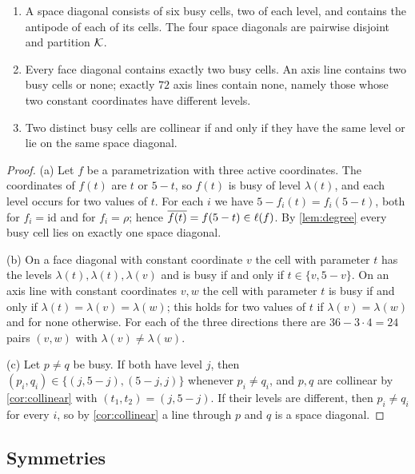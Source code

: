 \begin{lemma}\label{lem:busy}
\begin{enumerate}[label=\textup{(\alph*)}]
\item A space diagonal consists of six busy cells, two of each level, and contains the antipode of each
      of its cells. The four space diagonals are pairwise disjoint and partition $\mathcal{K}$.
\item Every face diagonal contains exactly two busy cells. An axis line contains two busy cells or none;
      exactly $72$ axis lines contain none, namely those whose two constant coordinates have different
      levels.
\item Two distinct busy cells are collinear if and only if they have the same level or lie on the same
      space diagonal.
\end{enumerate}
\end{lemma}

\begin{proof}
(a) Let $f$ be a parametrization with three active coordinates. The coordinates of $f(t)$ are $t$ or
$5-t$, so $f(t)$ is busy of level $\lambda(t)$, and each level occurs for two values of $t$. For each $i$
we have $5-f_i(t)=f_i(5-t)$, both for $f_i=\mathrm{id}$ and for $f_i=\rho$; hence
$\overline{f(t)}=f(5-t)\in\ell(f)$. By \cref{lem:degree} every busy cell lies on exactly one space diagonal.

(b) On a face diagonal with constant coordinate $v$ the cell with parameter $t$ has the levels
$\lambda(t),\lambda(t),\lambda(v)$ and is busy if and only if $t\in\{v,5-v\}$. On an axis line with constant
coordinates $v,w$ the cell with parameter $t$ is busy if and only if $\lambda(t)=\lambda(v)=\lambda(w)$;
this holds for two values of $t$ if $\lambda(v)=\lambda(w)$ and for none otherwise. For each of the three
directions there are $36-3\cdot 4=24$ pairs $(v,w)$ with $\lambda(v)\ne\lambda(w)$.

(c) Let $p\ne q$ be busy. If both have level $j$, then $(p_i,q_i)\in\{(j,5-j),(5-j,j)\}$ whenever
$p_i\ne q_i$, and $p,q$ are collinear by \cref{cor:collinear} with $(t_1,t_2)=(j,5-j)$. If their levels are
different, then $p_i\ne q_i$ for every $i$, so by \cref{cor:collinear} a line through $p$ and $q$ is a
space diagonal.
\end{proof}

\subsection{Symmetries}\label{ssec:group}

